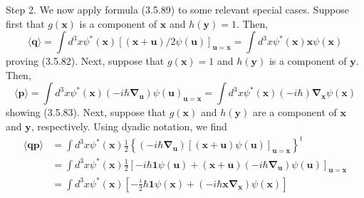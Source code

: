 \documentclass{article}
\begin{document}
Step 2. We now apply formula (3.5.89) to some relevant special cases. Suppose first that $g(\boldsymbol{x})$ is a component of $\boldsymbol{x}$ and $h(\boldsymbol{y})=1$. Then,
$$
\begin{equation*}
\langle\boldsymbol{q}\rangle=\int d^{3} x \psi^{*}(\boldsymbol{x})[(\boldsymbol{x}+\boldsymbol{u}) / 2 \psi(\boldsymbol{u})]_{\boldsymbol{u}=\boldsymbol{x}}=\int d^{3} x \psi^{*}(\boldsymbol{x}) \boldsymbol{x} \psi(\boldsymbol{x}) \tag{3.5.90}
\end{equation*}
$$
proving (3.5.82). Next, suppose that $g(\boldsymbol{x})=1$ and $h(\boldsymbol{y})$ is a component of $\boldsymbol{y}$. Then,
$$
\begin{equation*}
\langle\boldsymbol{p}\rangle=\int d^{3} x \psi^{*}(\boldsymbol{x})\left(-i \hbar \boldsymbol{\nabla}_{\boldsymbol{u}}\right) \psi(\boldsymbol{u})_{\boldsymbol{u}=\boldsymbol{x}}=\int d^{3} x \psi^{*}(\boldsymbol{x})(-i \hbar) \boldsymbol{\nabla}_{\boldsymbol{x}} \psi(\boldsymbol{x}) \tag{3.5.91}
\end{equation*}
$$
showing (3.5.83). Next, suppose that $g(\boldsymbol{x})$ and $h(\boldsymbol{y})$ are a component of $\boldsymbol{x}$ and $\boldsymbol{y}$, respectively. Using dyadic notation, we find
$$
\begin{align*}
\langle\boldsymbol{q} \boldsymbol{p}\rangle & =\int d^{3} x \psi^{*}(\boldsymbol{x}) \frac{1}{2}\left\{\left(-i \hbar \boldsymbol{\nabla}_{\boldsymbol{u}}\right)[(\boldsymbol{x}+\boldsymbol{u}) \psi(\boldsymbol{u})]_{\boldsymbol{u}=\boldsymbol{x}}\right\}^{t}  \tag{3.5.92}\\
& =\int d^{3} x \psi^{*}(\boldsymbol{x}) \frac{1}{2}\left[-i \hbar \mathbf{1} \psi(\boldsymbol{u})+(\boldsymbol{x}+\boldsymbol{u})\left(-i \hbar \boldsymbol{\nabla}_{\boldsymbol{u}}\right) \psi(\boldsymbol{u})\right]_{\boldsymbol{u}=\boldsymbol{x}} \\
& =\int d^{3} x \psi^{*}(\boldsymbol{x})\left[-\frac{i}{2} \hbar \mathbf{1} \psi(\boldsymbol{x})+\left(-i \hbar \boldsymbol{x} \boldsymbol{\nabla}_{\boldsymbol{x}}\right) \psi(\boldsymbol{x})\right]
\end{align*}
$$
\end{document}
